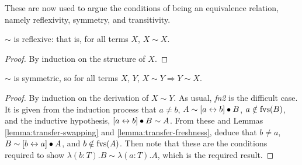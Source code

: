 These are now used to argue the conditions of being an equivalence relation, namely reflexivity, symmetry, and transitivity.

\begin{lemma}
\(\sim\) is reflexive: that is, for all terms \(X\), \(X \sim X\).
\end{lemma}
\begin{proof}
By induction on the structure of \(X\).
\end{proof}

\begin{lemma}
\(\sim\) is symmetric, so for all terms \(X\), \(Y\), \(X \sim Y \Longrightarrow Y \sim X\).
\end{lemma}
\begin{proof}
By induction on the derivation of \(X \sim Y\).
As usual, \emph{fn2} is the difficult case.
It is given from the induction process that \(a \neq b\), \(A \sim [a \leftrightarrow b] \bullet B\), \(a \notin \mathrm{fvs}(B)\), and the inductive hypothesis, \([a \leftrightarrow b] \bullet B \sim A\).
From these and Lemmas \ref{lemma:transfer-swapping} and \ref{lemma:transfer-freshness}, deduce that \(b \neq a\), \(B \sim [b \leftrightarrow a] \bullet A\), and \(b \notin \mathrm{fvs}(A)\).
Then note that these are the conditions required to show \(\lambda (b:T).B \sim \lambda (a:T).A\), which is the required result.
\end{proof}

